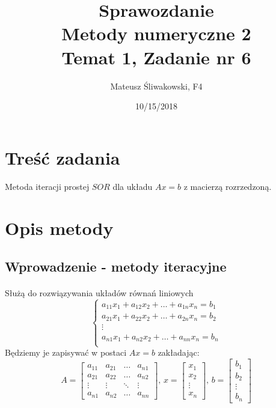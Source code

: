 \documentclass{article}
\title{Sprawozdanie \\Metody numeryczne 2 \\\textbf{Temat 1, Zadanie nr 6}}
\date{10/15/2018}
\author{Mateusz Śliwakowski, F4}
\begin{document}
  \maketitle
	  \newpage
\section{Treść zadania}
\paragraph{}
 Metoda iteracji prostej $SOR$ dla układu \(Ax = b\) z macierzą rozrzedzoną.
\section{Opis metody}

\subsection {Wprowadzenie - metody iteracyjne}
\paragraph{}
Służą do rozwiązywania układów równań liniowych
\[
\left\{ 
\begin{array}{c}
a_{11}x_1+a_{12}x_2+\dots+a_{1n}x_n=b_1 \\ 
a_{21}x_1+a_{22}x_2+\dots+a_{2n}x_n=b_2 \\ 
\vdots\\
a_{n1}x_1+a_{n2}x_2+\dots+a_{nn}x_n=b_n \\ 
\end{array}
\right.
\]
Będziemy je zapisywać w postaci \(Ax = b\) zakładając: \\
\[A=\begin{bmatrix}
  a_{11} & a_{21} & \dots & a_{n1}\\
  a_{21} & a_{22} & \dots & a_{n2}\\
 \vdots & \vdots & \ddots & \vdots \\
  a_{n1} & a_{n2} & \dots & a_{nn}
\end{bmatrix},\hspace{2pt}
 x=\begin{bmatrix}
 x_1\\
 x_2\\
 \vdots\\
 x_n
\end{bmatrix}, \hspace{2pt}
 b=\begin{bmatrix}
 b_1\\
 b_2\\
 \vdots\\
 b_n
\end{bmatrix}\]
\end{document}
